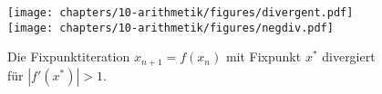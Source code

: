 %
%
%
\begin{figure}
\centering
\texttt{[image: chapters/10-arithmetik/figures/divergent.pdf]}
\texttt{[image: chapters/10-arithmetik/figures/negdiv.pdf]}
\caption{Die Fixpunktiteration $x_{n+1}=f(x_n)$ mit Fixpunkt $x^*$
divergiert für $|f'(x^*)|>1$.
\label{buch:figure:fixpunkt:divergent}}
\end{figure}
